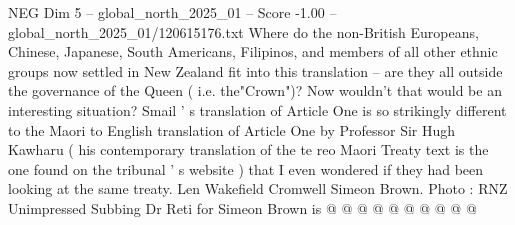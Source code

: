 \begin{textsample}{NEG Dim 5 – global\_north\_2025\_01 – Score -1.00 – global\_north\_2025\_01/120615176.txt}
Where do the non-British Europeans, Chinese, Japanese, South Americans, Filipinos, and members of all other ethnic groups now settled in New Zealand fit into this translation -- are they all outside the governance of the Queen ( i.e. the"Crown")?
Now wouldn't that would be an interesting situation?
Smail ' s translation of Article One is so strikingly different to the Maori to English translation of Article One by Professor Sir Hugh Kawharu ( his contemporary translation of the te reo Maori Treaty text is the one found on the tribunal ' s website ) that I even wondered if they had been looking at the same treaty.
Len Wakefield Cromwell Simeon Brown.
Photo : RNZ Unimpressed Subbing Dr Reti for Simeon Brown is @ @ @ @ @ @ @ @ @ @

\end{textsample}

